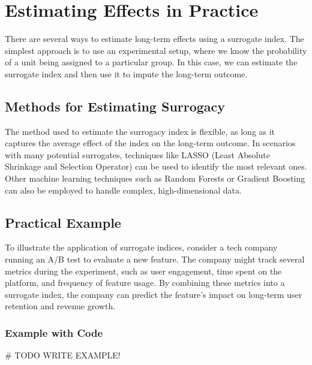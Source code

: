 \documentclass[
  letterpaper,
  DIV=11,
  numbers=noendperiod]{scrreprt}
\newenvironment{Shaded}{\begin{snugshade}}{\end{snugshade}}
\newcommand{\AlertTok}[1]{\textcolor[rgb]{0.68,0.00,0.00}{#1}}
\newcommand{\CommentTok}[1]{\textcolor[rgb]{0.37,0.37,0.37}{#1}}
\begin{document}
\section{Estimating Effects in
Practice}\label{estimating-effects-in-practice}

There are several ways to estimate long-term effects using a surrogate
index. The simplest approach is to use an experimental setup, where we
know the probability of a unit being assigned to a particular group. In
this case, we can estimate the surrogate index and then use it to impute
the long-term outcome.

\subsection{Methods for Estimating
Surrogacy}\label{methods-for-estimating-surrogacy}

The method used to estimate the surrogacy index is flexible, as long as
it captures the average effect of the index on the long-term outcome. In
scenarios with many potential surrogates, techniques like LASSO (Least
Absolute Shrinkage and Selection Operator) can be used to identify the
most relevant ones. Other machine learning techniques such as Random
Forests or Gradient Boosting can also be employed to handle complex,
high-dimensional data.

\subsection{Practical Example}\label{practical-example}

To illustrate the application of surrogate indices, consider a tech
company running an A/B test to evaluate a new feature. The company might
track several metrics during the experiment, such as user engagement,
time spent on the platform, and frequency of feature usage. By combining
these metrics into a surrogate index, the company can predict the
feature's impact on long-term user retention and revenue growth.

\subsubsection{Example with Code}\label{example-with-code}

\begin{Shaded}
\begin{Highlighting}[]
\CommentTok{\# }\AlertTok{TODO}\CommentTok{ WRITE EXAMPLE!}
\end{Highlighting}
\end{Shaded}
\end{document}
